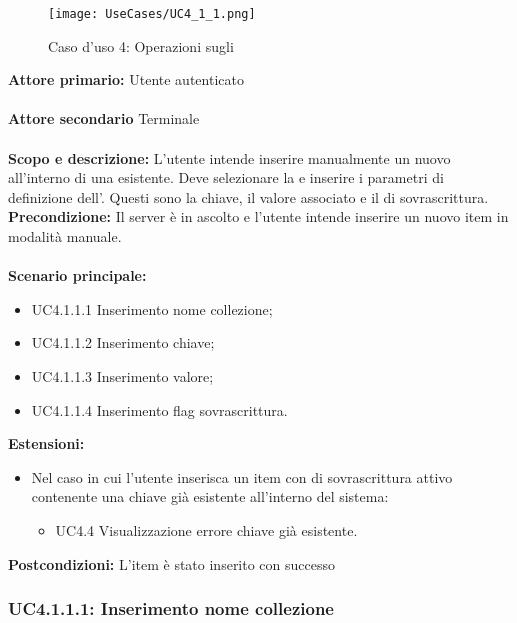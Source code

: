 \documentclass{scalatekids-article}
\begin{document}
\begin{figure}[H]
  \begin{center}
    \texttt{[image: UseCases/UC4\_1\_1.png]}
    \caption*{Caso d'uso 4: Operazioni sugli }
  \end{center}
\end{figure}
\textbf{Attore primario:} Utente autenticato\\ \\
\textbf{Attore secondario} Terminale\\ \\
\textbf{Scopo e descrizione:} L'utente intende inserire manualmente un nuovo  all'interno di una  esistente. Deve selezionare la  e inserire i parametri di definizione dell'. Questi sono la chiave, il valore associato e il  di sovrascrittura.
\textbf{Precondizione:} Il server è in ascolto e l'utente intende inserire un nuovo item in modalità manuale.\\ \\
\textbf{Scenario principale:}
\begin{itemize}
\item UC4.1.1.1 Inserimento nome collezione;
\item UC4.1.1.2 Inserimento chiave;
\item UC4.1.1.3 Inserimento valore;
\item UC4.1.1.4 Inserimento flag sovrascrittura.
\end{itemize}
\textbf{Estensioni:}
\begin{itemize}
\item Nel caso in cui l'utente inserisca un item con  di sovrascrittura attivo contenente una chiave già esistente all'interno del sistema:
  \begin{itemize}
  \item UC4.4 Visualizzazione errore chiave già esistente.
  \end{itemize}
\end{itemize}
\textbf{Postcondizioni:} L'item è stato inserito con successo

\subsubsection{UC4.1.1.1: Inserimento nome collezione}
\end{document}
